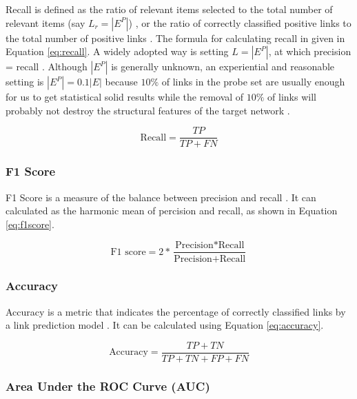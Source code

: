 Recall is defined as the ratio of relevant items selected to the total number of relevant items (say $L_r = |E^P|$) \cite{zhou2021progresses}, or the ratio of correctly classified positive links to the total number of positive links \cite{arrar2023comprehensive}. The formula for calculating recall in given in Equation \ref{eq:recall}. A widely adopted way is setting $L = |E^P|$, at which precision = recall \cite{lu2011link, liben2003link, zhou2021progresses}. Although $|E^P|$ is generally unknown, an experiential and reasonable setting is  $|E^P| = 0.1 |E|$ because $10\%$ of links in the probe set are usually enough for us to get statistical solid results while the removal of $10\%$ of links will probably not destroy the structural features of the target network \cite{lu2015toward}.

\begin{equation}
\label{eq:recall}
  \text{Recall} = \frac{TP}{TP + FN}
\end{equation}


\subsubsection{F1 Score}

F1 Score is a measure of the balance between precision and recall \cite{arrar2023comprehensive}. It can calculated as the harmonic mean of percision and recall, as shown in Equation \ref{eq:f1score}.

\begin{equation}
\label{eq:f1score}
  \text{F1 score} = 2 * \frac{\text{Precision} * \text{Recall}}{\text{Precision} + \text{Recall}}
\end{equation}


\subsubsection{Accuracy}

Accuracy is a metric that indicates the percentage of correctly classified links by a link prediction model \cite{arrar2023comprehensive}. It can be calculated using Equation \ref{eq:accuracy}.

\begin{equation}
\label{eq:accuracy}
  \text{Accuracy} = \frac{TP + TN}{TP + TN + FP + FN}
\end{equation}


\subsubsection{Area Under the ROC Curve (AUC)}

